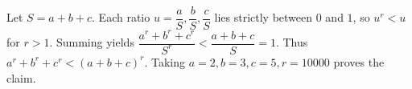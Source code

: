 Let $S=a+b+c$. Each ratio $u=\dfrac{a}{S},\dfrac{b}{S},\dfrac{c}{S}$ lies strictly between $0$ and $1$, so $u^r<u$ for $r>1$. Summing yields $\dfrac{a^r+b^r+c^r}{S^r}<\dfrac{a+b+c}{S}=1$. Thus $a^r+b^r+c^r<(a+b+c)^r$. Taking $a=2,b=3,c=5,r=10000$ proves the claim.
